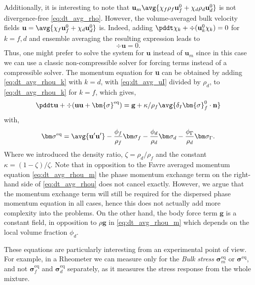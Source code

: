 Additionally, it is interesting to note that $\textbf{u}_m \avg{\chi_f\rho_f \textbf{u}_f^0 + \chi_d \rho_d \textbf{u}_d^0} $ is not divergence-free \eqref{eq:dt_avg_rho}. 
However,  the volume-averaged bulk velocity fields $\textbf{u} = \avg{\chi_f \textbf{u}_f^0 + \chi_d \textbf{u}_d^0} $ is. 
Indeed, adding $\pddt \chi_k + \div (\textbf{u}_k^0\chi_k) =0$ for $k=f,d$ and ensemble averaging the resulting expression leads to 
\begin{equation}
    \div\textbf{u}=0.
\end{equation}
Thus, one might prefer to solve the system for $\textbf{u}$ instead of $\textbf{u}_m$ since in this case we can use a classic non-compressible solver for forcing terms instead of a compressible solver. 
The momentum equation for \textbf{u} can be obtained by adding \ref{eq:dt_avg_rhou_k} with $k=d$, with \ref{eq:dt_avg_uI} divided by $\rho_d$, to \ref{eq:dt_avg_rhou_k} for $k=f$, which gives, 
\begin{equation}
    \pddt \textbf{u}  
    + \div (
        \textbf{u}\textbf{u}
        + \bm{\sigma}^\text{eq}
    )
    = 
    \textbf{g} 
    + \kappa/\rho_f  \avg{\delta_I \bm{\sigma}_f^0 \cdot \textbf{n}} 
    \label{eq:dt_avg_rhou}
\end{equation}
with, 
\begin{equation}
    \bm\sigma^\text{eq} = 
    \avg{ \textbf{u}'\textbf{u}'}
    - \frac{\phi_f}{\rho_f}\bm\sigma_f
    - \frac{\phi_d}{\rho_d}\bm\sigma_d
    - \frac{\phi_\Gamma}{\rho_d} \bm\sigma_\Gamma. 
\end{equation}
Where we introduced the density ratio, $\zeta = \rho_d  / \rho_f$ and the constant $\kappa = (1-\zeta)/\zeta$. 
Note that in opposition to the Favre averaged momentum equation \eqref{eq:dt_avg_rhou_m} the phase momentum exchange term on the right-hand side of \ref{eq:dt_avg_rhou} does not cancel exactly. 
However, we argue that the momentum exchange term will still be required for the dispersed phase momentum equation in all cases, hence this does not actually add more complexity into the problems.
On the other hand, the body force term $\textbf{g}$ is a constant field, in opposition to $\rho \textbf{g}$ in \eqref{eq:dt_avg_rhou_m} which depends on the local volume fraction $\phi_d$. 


These equations are particularly interesting from an experimental point of view. 
For example, in a Rheometer we can measure only for the \textit{Bulk stress} $\bm\sigma^\text{eq}_m$ or $\bm\sigma^\text{eq}$, and not $\bm\sigma^\text{eq}_f$ and $\bm\sigma^\text{eq}_d$ separately, as it measures the stress response from the whole mixture. 

